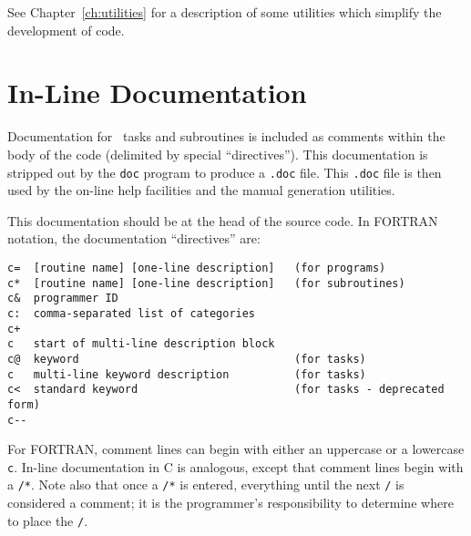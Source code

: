 \documentclass{report}
\begin{document}
See Chapter~\ref{ch:utilities} for a description of some utilities which
simplify the development of code.

\section{In-Line Documentation}
Documentation for \miriad\ tasks and subroutines is included as comments
within the body of the code (delimited by special ``directives''). This
documentation is stripped out by the \verb+doc+ program to produce a
\verb+.doc+ file. This \verb+.doc+ file is then used by the on-line
help facilities and the manual generation utilities.

This documentation should be at the head of the source code.  In FORTRAN
notation, the documentation ``directives'' are:
{\begin{verbatim}
c=  [routine name] [one-line description]   (for programs)
c*  [routine name] [one-line description]   (for subroutines)
c&  programmer ID
c:  comma-separated list of categories
c+
c   start of multi-line description block
c@  keyword                                 (for tasks)
c   multi-line keyword description          (for tasks)
c<  standard keyword                        (for tasks - deprecated form)
c--
\end{verbatim}}
For FORTRAN, comment lines can begin with either an uppercase or a
lowercase {\tt c}. In-line documentation in C is analogous, except that
comment lines begin with a {\tt /*}. Note also that once a
{\tt /*} is entered, everything until the next {\tt */} is considered
a comment; it is the programmer's responsibility to determine where to
place the {\tt */}.
\end{document}
